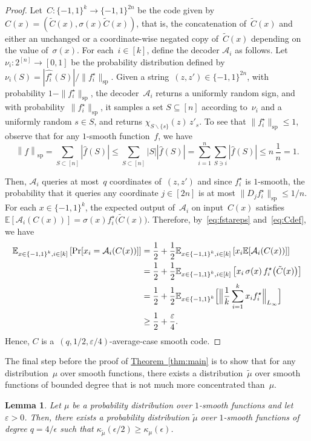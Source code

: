 \documentclass[11pt]{article}
\numberwithin{equation}{section}
\newtheorem{lemma}[theorem]{Lemma}
\theoremstyle{definition}
\theoremstyle{plain}
\newcommand{\expref}[2]{\hyperref[#2]{#1~\ref{#2}}}
\newcommand{\pmset}[1]{\{-1,1\}^{#1}} %
\newcommand{\sBC}{{\{-1,1\}}}
\newcommand{\E}{\mathbb{E}}
\newcommand{\specnorm}[1]{\left\lVert #1 \right\rVert_{\mathrm{sp}}}
\newcommand{\eps}{\varepsilon}
\renewcommand{\Pr}{\mbox{\rm Pr}}
\newcommand{\cA}{{\mathcal A}}
\DeclareMathOperator{\Anorm}{sp}
\newcommand{\beqn}{\begin{equation*}}
\newcommand{\eeqn}{\end{equation*}}
\begin{document}
\begin{proof}
Let~$C:\pmset{k}\to\pmset{2n}$ be the code given by $C(x) = (\tilde C(x), \sigma(x)\tilde C(x))$,
that is, the concatenation of~$\tilde C(x)$ and either an unchanged or a coordinate-wise negated copy of~$\tilde C(x)$ depending on the value of~$\sigma(x)$.
For each~$i\in[k]$, define the decoder $\cA_i$ as follows.
Let $\nu_i:2^{[n]}\to[0,1]$ be the probability distribution defined by $\nu_i(S) = |\widehat{f_i^\star}(S)|/\|f_i^\star\|_{\Anorm}$.
Given a string~$(z,z')\in\pmset{2n}$, with probability $1 -\|f_i^\star\|_{\Anorm}$, the decoder~$\mathcal A_i$ returns a uniformly random sign, and with probability~$\|f_i^\star\|_{\Anorm}$, it samples a set $S\subseteq[n]$ according to~$\nu_i$ and a uniformly random $s\in S$, and returns $\chi_{S\smallsetminus\{s\}}(z)\, z'_s$.
To see that $\|f_i^\star\|_{\Anorm}\le 1$, observe that for any $1$-smooth function~$f$, we have
\beqn
\specnorm{f}=\sum_{S\subset [n]}|\widehat{f}(S)|\le \sum_{S\subset [n]}|S||\widehat{f}(S)|=\sum_{i=1}^n\sum_{S\ni i} |\widehat{f}(S)| \le n\, \frac{1}{n}=1.
\eeqn

Then, $\mathcal A_i$ queries at most~$q$ coordinates of~$(z,z')$ and since $f_i^\star$ is $1$-smooth, the probability that it queries any coordinate $j\in[2n]$ is at most $\|D_jf_i^\star\|_{\Anorm} \le 1/n$.
For each $x\in \pmset{k}$, the expected output of~$\mathcal A_i$ on input~$C(x)$ satisfies $\E[\cA_i(C(x))] = \sigma(x) f_i^\star\big(\tilde C(x)\big)$.
Therefore, by~\eqref{eq:fstareps} and~\eqref{eq:Cdef}, we have
\begin{align*}
\E_{x\in \sBC^k, i\in [k]}\left[\Pr[x_i=\cA_i(C(x))]\right]&=\frac{1}{2}+\frac{1}{2}\E_{x\in \sBC^k, i\in [k]}\left[x_i\E[\cA_i(C(x))]\right]\\
&=\frac{1}{2}+\frac{1}{2}\E_{x\in \sBC^k, i\in [k]}\left[x_i\, \sigma(x)\,f_i^\star\big(\tilde C(x)\big)\right]\\
&=
\frac{1}{2}+\frac{1}{2}
\E_{x\in \sBC^k}\Big[\Big\|\frac{1}{k}\sum_{i=1}^k x_if_i^\star\Big\|_{L_\infty}\Big]\\
&\ge \frac{1}{2}+\frac{\eps}{4}.
\end{align*}
Hence, $C$ is a~$(q, 1/2, \eps/4)$-average-case smooth code.
\end{proof}

The final step before the proof of \expref{Theorem}{thm:main} is to show that for any distribution~$\mu$ over smooth functions, there exists a distribution~$\tilde\mu$ over smooth functions of bounded degree that is not much more concentrated than~$\mu$.

\begin{lemma}
\label{lem:truncate_smooth_dist}
Let $\mu$ be a probability distribution over $1$-smooth functions and let  $\eps>0$.
Then, there exists a probability distribution $\tilde{\mu}$ over $1$-smooth functions of degree $q=4/\epsilon$ such that $\kappa_{\tilde{\mu}}(\epsilon/2)\ge \kappa_\mu(\epsilon)$.
\end{lemma}
\end{document}
